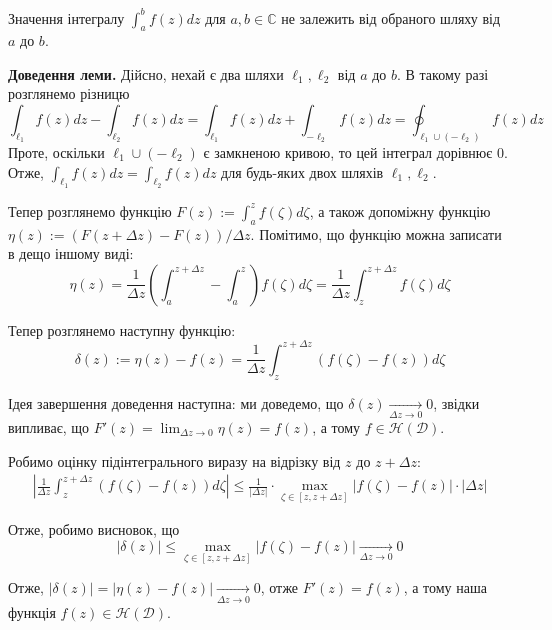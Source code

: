 \documentclass[14pt]{extarticle}
\newcommand{\<}{\langle}
\renewcommand{\>}{\rangle}
\theoremstyle{mystyle}{\newtheorem{definition}{Definition}[section]}
\theoremstyle{mystyle}{\newtheorem{proposition}[definition]{Proposition}}
\theoremstyle{mystyle}{\newtheorem{theorem}[definition]{Theorem}}
\theoremstyle{mystyle}{\newtheorem{lemma}[definition]{Lemma}}
\theoremstyle{mystyle}{\newtheorem{corollary}[definition]{Corollary}}
\theoremstyle{mystyle}{\newtheorem*{remark}{Remark}}
\theoremstyle{mystyle}{\newtheorem*{remarks}{Remarks}}
\theoremstyle{mystyle}{\newtheorem*{example}{Example}}
\theoremstyle{mystyle}{\newtheorem*{examples}{Examples}}
\theoremstyle{definition}{\newtheorem*{exercise}{Exercise}}
\theoremstyle{cstyle}{\newtheorem*{cthm}{}}
\theoremstyle{warn}
\begin{document}
\begin{lemma}
    Значення інтегралу $\int_a^b f(z)dz$ для $a,b \in \mathbb{C}$ не залежить від обраного шляху від $a$ до $b$.
\end{lemma}

\textbf{Доведення леми.} Дійсно, нехай є два шляхи $\ell_1,\ell_2$ від $a$ до $b$. В такому разі розглянемо різницю
\begin{equation}
\int_{\ell_1}f(z)dz - \int_{\ell_2}f(z)dz = \int_{\ell_1}f(z)dz + \int_{-\ell_2}f(z)dz = \oint_{\ell_1 \cup (-\ell_2)}f(z)dz
\end{equation}
Проте, оскільки $\ell_1\cup(-\ell_2)$ є замкненою кривою, то цей інтеграл дорівнює 0. Отже, $\int_{\ell_1}f(z)dz = \int_{\ell_2}f(z)dz$ для будь-яких двох шляхів $\ell_1,\ell_2$.
\vspace{10px}

Тепер розглянемо функцію $F(z) := \int_a^z f(\zeta)d\zeta$, а також допоміжну функцію $\eta(z):=(F(z+\Delta z)-F(z))\Big/\Delta z$. Помітимо, що функцію можна записати в дещо іншому виді:
\begin{equation}
\eta(z) = \frac{1}{\Delta z} \left(\int_{a}^{z+\Delta z}-\int_a^z\right)f(\zeta)d\zeta = \frac{1}{\Delta z}\int_{z}^{z+\Delta z}f(\zeta)d\zeta
\end{equation}

Тепер розглянемо наступну функцію:
\begin{equation}
\delta(z) := \eta(z) - f(z) = \frac{1}{\Delta z}\int_z^{z+\Delta z}(f(\zeta)-f(z))d\zeta
\end{equation}

Ідея завершення доведення наступна: ми доведемо, що $\delta(z) \xrightarrow[\Delta z \to 0]{} 0$, звідки випливає, що $F'(z) = \lim_{\Delta z \to 0}\eta(z) = f(z)$, а тому $f \in \mathcal{H}(\mathcal{D})$.

Робимо оцінку підінтегрального виразу на відрізку від $z$ до $z + \Delta z$:
\begin{gather*}
\left|\frac{1}{\Delta z}\int_z^{z+\Delta z}(f(\zeta)-f(z))d\zeta\right| \leq \frac{1}{|\Delta z|} \cdot \max_{\zeta \in [z,z+\Delta z]}|f(\zeta)-f(z)| \cdot |\Delta z|
\end{gather*}

Отже, робимо висновок, що
\begin{equation}
    |\delta(z)| \leq \max_{\zeta \in [z,z+\Delta z]}|f(\zeta)-f(z)| \xrightarrow[\Delta z \to 0]{} 0
\end{equation}

Отже, $|\delta(z)|=|\eta(z)-f(z)| \xrightarrow[\Delta z \to 0]{} 0$, отже $F'(z)=f(z)$, а тому наша функція $f(z) \in \mathcal{H}(\mathcal{D})$.
\end{document}
